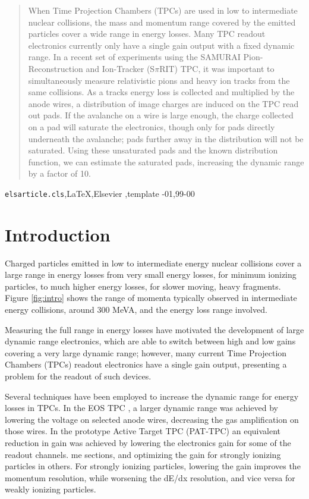 \documentclass[review]{elsarticle}
\begin{document}
\begin{frontmatter}
\begin{abstract}
When Time Projection Chambers (TPCs) are used in low to intermediate nuclear collisions, the mass and momentum range covered by the emitted particles cover a wide range in energy losses. Many TPC readout electronics currently only have a single gain output with a fixed dynamic range. In a recent set of experiments using the SAMURAI Pion-Reconstruction and Ion-Tracker (S$\pi$RIT) TPC, it was important to simultaneously measure relativistic pions and heavy ion tracks from the same collisions. As a tracks energy loss is collected and multiplied by the anode wires, a distribution of image charges are induced on the TPC read out pads. If the avalanche on a wire is large enough, the charge collected on a pad will saturate the electronics, though only for pads directly underneath the avalanche; pads further away in the distribution will not be saturated. Using these unsaturated pads and the known distribution function, we can estimate the saturated pads, increasing the dynamic range by a factor of 10.

\end{abstract}

\begin{keyword}
\texttt{elsarticle.cls}\sep \LaTeX\sep Elsevier \sep template
-01\sep  99-00
\end{keyword}

\end{frontmatter}

\linenumbers

\section{Introduction} 
 Charged particles emitted in low to intermediate energy nuclear collisions cover a large range in energy losses from very small energy losses, for minimum ionizing particles, to much higher energy losses, for slower moving, heavy fragments. Figure \ref{fig:intro} shows the range of momenta typically observed in intermediate energy collisions, around 300 MeVA, and the energy loss range involved.  
 
  Measuring the full range in energy losses have motivated the development of large dynamic range electronics, which are able to switch between high and low gains covering a very large dynamic range; however, many current Time Projection Chambers (TPCs) readout electronics have a single gain output, presenting a problem for the readout of such devices.
 
 Several techniques have been employed to increase the dynamic range for energy losses in TPCs. In the EOS TPC \cite{eos}, a larger dynamic range was achieved by lowering the voltage on selected anode wires, decreasing the gas amplification on those wires. In the prototype Active Target TPC (PAT-TPC) an equivalent reduction in gain was achieved by lowering the electronics gain for some of the readout channels. 
me sections, and optimizing the gain for strongly ionizing particles in others. For strongly ionizing particles, lowering the gain improves the momentum resolution, while worsening the dE/dx resolution, and vice versa for weakly ionizing particles. 
 
\end{document}
